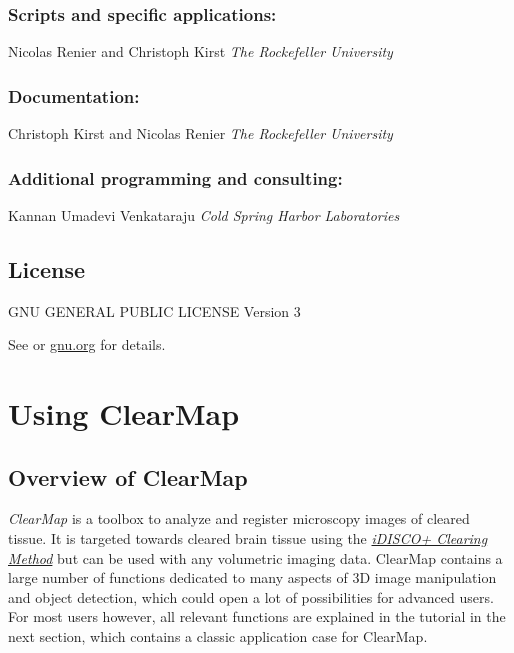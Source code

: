 \documentclass[letterpaper,10pt,english]{sphinxmanual}
\begin{document}
\subsection{Scripts and specific applications:}
\label{index:scripts-and-specific-applications}
Nicolas Renier and Christoph Kirst
\emph{The Rockefeller University}


\subsection{Documentation:}
\label{index:documentation}
Christoph Kirst and Nicolas Renier
\emph{The Rockefeller University}


\subsection{Additional programming and consulting:}
\label{index:additional-programming-and-consulting}
Kannan Umadevi Venkataraju
\emph{Cold Spring Harbor Laboratories}


\section{License}
\label{index:license}
GNU GENERAL PUBLIC LICENSE Version 3

See  or \href{http://www.gnu.org/licenses/gpl-3.0.en.html}{gnu.org} for details.


\chapter{Using ClearMap}
\label{index:using-clearmap}

\section{Overview of ClearMap}
\label{introduction::doc}\label{introduction:overview-of-clearmap}
\emph{ClearMap} is a toolbox to analyze and register microscopy images of cleared
tissue. It is targeted towards cleared brain tissue using the {\hyperref[introduction:idisco-clearing-method]{\emph{iDISCO+ Clearing Method}}}
but can be used with any volumetric imaging data. ClearMap contains a large number of functions dedicated to many aspects of 3D image manipulation and object detection, which could open a lot of possibilities for advanced users. For most users however, all relevant functions are explained in the tutorial in the next section, which contains a classic application case for ClearMap.
\end{document}
